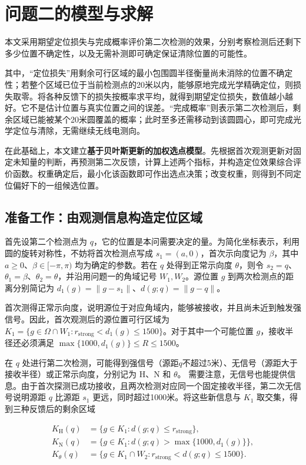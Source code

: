 \section{问题二的模型与求解}

本文采用期望定位损失与完成概率评价第二次检测的效果，分别考察检测后还剩下多少位置不确定性，以及无需补测即可确定保证清除位置的可能性。

其中，“定位损失”用剩余可行区域的最小包围圆半径衡量尚未消除的位置不确定性；若整个区域已位于当前检测点的20米以内，能够原地完成光学精确定位，则损失取零。将各种反馈下的损失按概率求平均，就得到期望定位损失，数值越小越好。它不是估计位置与真实位置之间的误差。“完成概率”则表示第二次检测后，剩余区域已能被某个20米圆覆盖的概率；此时至多还需移动到该圆圆心，即可完成光学定位与清除，无需继续无线电测向。

在此基础上，本文建立\textbf{基于贝叶斯更新的加权选点模型}。先根据首次观测更新对固定未知量的判断，再预测第二次反馈，计算上述两个指标，并构造定位效果综合评价函数。权重确定后，最小化该函数即可作出选点决策；改变权重，则得到不同定位偏好下的一组候选位置。

\subsection{准备工作：由观测信息构造定位区域}

首先设第二个检测点为 \(q\)，它的位置是本问需要决定的量。为简化坐标表示，利用圆的旋转对称性，不妨将首次检测点写成 \(s_1=(a,0)\)，首次示向度记为 \(\beta\)，其中 \(a\ge0\)、\(\beta\in[-\pi,\pi)\) 均为确定的参数。若在 \(q\) 处得到正常示向度 \(\theta\)，则令 \(s_2=q\)、\(\theta_1=\beta\)、\(\theta_2=\theta\)，并沿用问题一的角域记号 \(W_1,W_2\)。源位置 \(g\) 到两次检测点的距离分别简记为 \(d_1(g)=\|g-s_1\|\)、\(d(g;q)=\|g-q\|\)。

首次测得正常示向度，说明源位于对应角域内，能够被接收，并且尚未近到触发强信号。因此，首次观测后的源位置可行区域为 \(K_1=\{g\in\Omega\cap W_1:r_{\mathrm{strong}}<d_1(g)\le1500\}\)。对于其中一个可能位置 \(g\)，接收半径还必须满足 \(\max\{1000,d_1(g)\}\le R\le1500\)。

在 \(q\) 处进行第二次检测，可能得到强信号（源距\(q\)不超过5米）、无信号（源距大于接收半径）或正常示向度，分别记为 \(\mathrm H\)、\(\mathrm N\) 和 \(\theta\)。
需要注意，无信号也能提供信息。由于首次探测已成功接收，且两次检测对应同一个固定接收半径，第二次无信号说明源距 \(q\) 比源距 \(s_1\) 更远，同时超过1000米。将这些新信息与 \(K_1\) 取交集，得到三种反馈后的剩余区域

\begin{equation}
\begin{aligned}
K_{\mathrm H}(q)&=\{g\in K_1:d(g;q)\le r_{\mathrm{strong}}\},\\
K_{\mathrm N}(q)&=\{g\in K_1:d(g;q)>\max\{1000,d_1(g)\}\},\\
K_\theta(q)&=\{g\in K_1\cap W_2:r_{\mathrm{strong}}<d(g;q)\le1500\}.
\end{aligned}
\label{eq:q2-pair-regions}
\end{equation}

